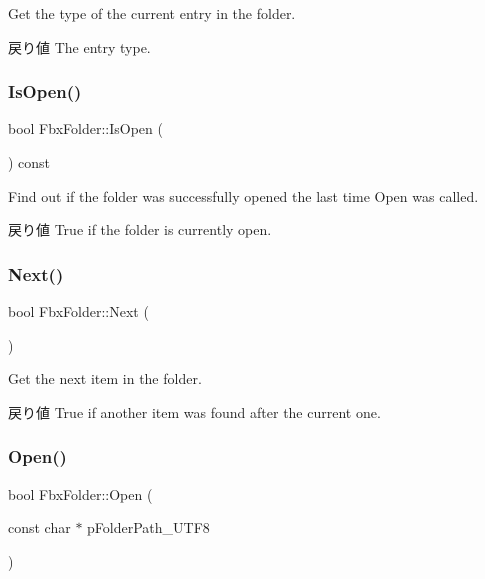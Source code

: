 Get the type of the current entry in the folder. \begin{DoxyReturn}{戻り値}
The entry type. 
\end{DoxyReturn}
\mbox{\label{class_fbx_folder_a350cdc0cd6b8bb625ebb7c4b560f9e45}} 
\subsubsection{\texorpdfstring{Is\+Open()}{IsOpen()}}
{\footnotesize\ttfamily bool Fbx\+Folder\+::\+Is\+Open (\begin{DoxyParamCaption}{ }\end{DoxyParamCaption}) const}

Find out if the folder was successfully opened the last time Open was called. \begin{DoxyReturn}{戻り値}
True if the folder is currently open. 
\end{DoxyReturn}
\mbox{\label{class_fbx_folder_aae7143fd3d6c61581af8d102564c904a}} 
\subsubsection{\texorpdfstring{Next()}{Next()}}
{\footnotesize\ttfamily bool Fbx\+Folder\+::\+Next (\begin{DoxyParamCaption}{ }\end{DoxyParamCaption})}

Get the next item in the folder. \begin{DoxyReturn}{戻り値}
True if another item was found after the current one. 
\end{DoxyReturn}
\mbox{\label{class_fbx_folder_a84cebc4677af006fa464547079e943c2}} 
\subsubsection{\texorpdfstring{Open()}{Open()}}
{\footnotesize\ttfamily bool Fbx\+Folder\+::\+Open (\begin{DoxyParamCaption}\item[{const char $\ast$}]{p\+Folder\+Path\+\_\+\+U\+T\+F8 }\end{DoxyParamCaption})}

